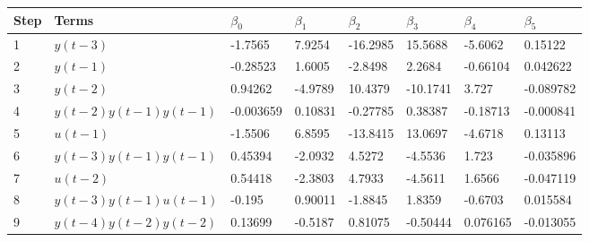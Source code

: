\begin{tabular}{llllllll}
Step & Terms & $\beta_{0}$ & $\beta_{1}$ & $\beta_{2}$ & $\beta_{3}$ & $\beta_{4}$ & $\beta_{5}$ \\ 
\hline 
1 & $y(t-3)$ & -1.7565 & 7.9254 & -16.2985 & 15.5688 & -5.6062 & 0.15122 \\ 
2 & $y(t-1)$ & -0.28523 & 1.6005 & -2.8498 & 2.2684 & -0.66104 & 0.042622 \\ 
3 & $y(t-2)$ & 0.94262 & -4.9789 & 10.4379 & -10.1741 & 3.727 & -0.089782 \\ 
4 & $y(t-2)y(t-1)y(t-1)$ & -0.003659 & 0.10831 & -0.27785 & 0.38387 & -0.18713 & -0.000841 \\ 
5 & $u(t-1)$ & -1.5506 & 6.8595 & -13.8415 & 13.0697 & -4.6718 & 0.13113 \\ 
6 & $y(t-3)y(t-1)y(t-1)$ & 0.45394 & -2.0932 & 4.5272 & -4.5536 & 1.723 & -0.035896 \\ 
7 & $u(t-2)$ & 0.54418 & -2.3803 & 4.7933 & -4.5611 & 1.6566 & -0.047119 \\ 
8 & $y(t-3)y(t-1)u(t-1)$ & -0.195 & 0.90011 & -1.8845 & 1.8359 & -0.6703 & 0.015584 \\ 
9 & $y(t-4)y(t-2)y(t-2)$ & 0.13699 & -0.5187 & 0.81075 & -0.50444 & 0.076165 & -0.013055 \\ 
\hline 
\end{tabular}